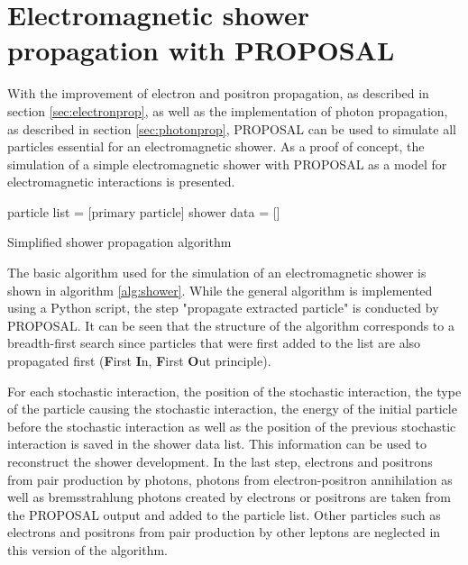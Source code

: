 \section{Electromagnetic shower propagation with PROPOSAL}

With the improvement of electron and positron propagation, as described in section \ref{sec:electronprop}, as well as the implementation of photon propagation, as described in section \ref{sec:photonprop}, PROPOSAL can be used to simulate all particles essential for an electromagnetic shower.
As a proof of concept, the simulation of a simple electromagnetic shower with PROPOSAL as a model for electromagnetic interactions is presented.

\begin{algorithm}[H]
\DontPrintSemicolon
 particle list = [primary particle]\;
 shower data = [\:]\;
 \caption{Simplified shower propagation algorithm}
 \label{alg:shower}
\end{algorithm}

The basic algorithm used for the simulation of an electromagnetic shower is shown in algorithm \ref{alg:shower}.
While the general algorithm is implemented using a Python script, the step "propagate extracted particle" is conducted by PROPOSAL. 
It can be seen that the structure of the algorithm corresponds to a breadth-first search since particles that were first added to the list are also propagated first (\textbf{F}irst \textbf{I}n, \textbf{F}irst \textbf{O}ut principle).

For each stochastic interaction, the position of the stochastic interaction, the type of the particle causing the stochastic interaction, the energy of the initial particle before the stochastic interaction as well as the position of the previous stochastic interaction is saved in the shower data list.
This information can be used to reconstruct the shower development.
In the last step, electrons and positrons from pair production by photons, photons from electron-positron annihilation as well as bremsstrahlung photons created by electrons or positrons are taken from the PROPOSAL output and added to the particle list.
Other particles such as electrons and positrons from pair production by other leptons are neglected in this version of the algorithm.


